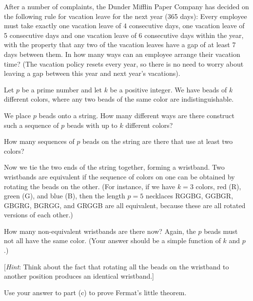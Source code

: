 After a number of complaints, the Dunder Mifflin Paper Company has decided on the following rule for vacation leave for the next year (365 days): Every employee must take exactly one vacation leave of 4 consecutive days, one vacation leave of 5 consecutive days and one vacation leave of 6 consecutive days within the year, with the property that any two of the vacation leaves have a gap of at least 7 days between them. In how many ways can an employee arrange their vacation time? (The vacation policy resets every year, so there is no need to worry about leaving a gap between this year and next year's vacations).


Let $p$ be a prime number and let $k$ be a positive integer.
We have beads of
$k$ different colors, where any two beads of the same color are indistinguishable.

\begin{Parts}
    \Part
    We place $p$ beads onto a string.
    How many different ways are there construct such a sequence of $p$ beads with up to $k$ different colors?

    \Part 
    How many sequences of $p$ beads on the string are there that use at least two colors?

    \Part
    Now we tie the two ends of the string together, forming a
    wristband.
    Two wristbands are equivalent if the sequence of colors on one
    can be obtained by rotating the beads on the other.
    (For instance, if we have $k=3$ colors, red (R), green (G), and
    blue (B), then the length $p = 5$ necklaces RGGBG, GGBGR, GBGRG, BGRGG, and GRGGB are all
    equivalent, because these are all rotated versions of each other.)

    How many non-equivalent wristbands are there now?
    Again, the $p$
    beads must not all have the same color.
    (Your answer should be a simple function of $k$ and $p$.)

    [\textit{Hint}: Think about the fact that rotating all the beads on the wristband to another
        position produces an identical wristband.]

    \Part Use your answer to part (c) to prove Fermat's little theorem.
\end{Parts}



